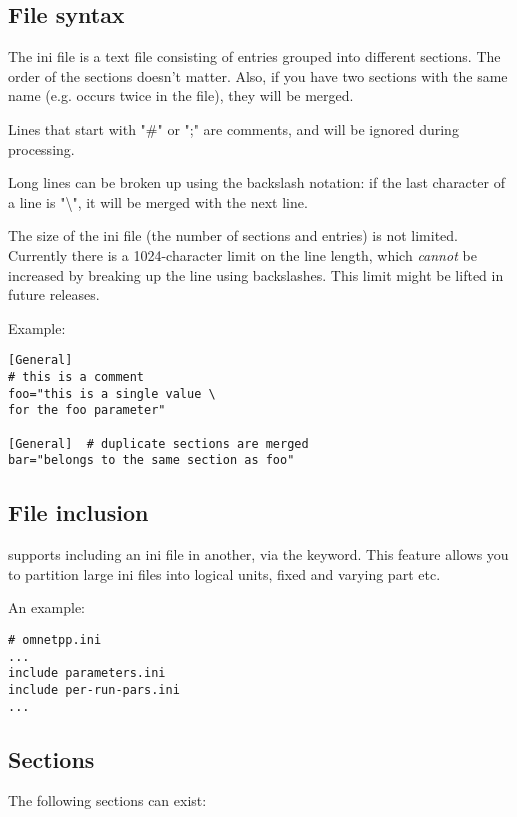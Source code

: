 \subsection{File syntax}

The ini file is a text file consisting of entries grouped into different sections.
The order of the sections doesn't matter. Also, if you have two sections
with the same name (e.g. \ttt{[General]} occurs twice in the file),
they will be merged.

Lines that start with "\#" or ";" are comments, and will be ignored during
processing.

Long lines can be broken up using the backslash notation: if the last character
of a line is "\textbackslash", it will be merged with the next line.

The size of the ini file (the number of sections and entries) is not limited.
Currently there is a 1024-character limit on the line length,
which \textit{cannot} be increased by breaking up the line using backslashes.
This limit might be lifted in future releases.

Example:

\begin{verbatim}
[General]
# this is a comment
foo="this is a single value \
for the foo parameter"

[General]  # duplicate sections are merged
bar="belongs to the same section as foo"
\end{verbatim}

\subsection{File inclusion}

{\opp} supports including an ini file in another,
via the \ttt{include} keyword. This feature allows you to partition large ini
files into logical units, fixed and varying part etc.

An example:

\begin{verbatim}
# omnetpp.ini
...
include parameters.ini
include per-run-pars.ini
...
\end{verbatim}


\subsection{Sections}

The following sections can exist:

